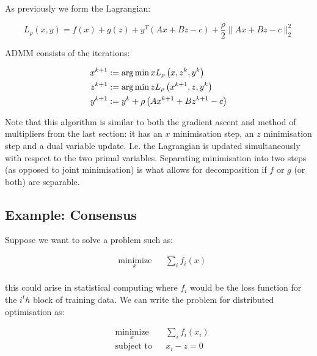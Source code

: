 \documentclass{article}
\begin{document}
As previously we form the Lagrangian:

\begin{equation}
L_\rho\left(x,y\right) = f\left( x \right) + g\left(z\right) + y^T\left(Ax+Bz-c\right) + \frac{\rho}{2}\|Ax+Bz-c\|_2^2
\end{equation}

ADMM consists of the iterations:

\begin{align}
x^{k+1} &:= \operatorname*{arg\,min}{x} L_\rho\left(x,z^k,y^k\right)\\
z^{k+1} &:= \operatorname*{arg\,min}{z} L_\rho\left(x^{k+1},z,y^k\right)\\
y^{k+1} &:= y^{k} + \rho \left(Ax^{k+1} + Bz^{k+1} - c\right)
\label{admm_algo}
\end{align}

Note that this algorithm is similar to both the gradient ascent and method of multipliers from the last section: it has an \(x\) minimisation step, an \(z\) minimisation step and a dual variable update. I.e. the Lagrangian is updated simultaneously with respect to the two primal variables. Separating minimisation into two steps (as opposed to joint minimisation) is what allows for decomposition if \(f\) or \(g\) (or both) are separable. 

\subsection{Example: Consensus}
Suppose we want to solve a problem such as:

\begin{equation*}
\begin{aligned}
& \underset{x}{\text{minimize}}
& & \sum_i f_i\left( x \right) \\
\label{consensus}
\end{aligned}
\end{equation*}

this could arise in statistical computing where \(f_i\) would be the loss function for the \(i^th\) block of training data. We can write the problem for distributed optimisation as:

\begin{equation*}
\begin{aligned}
& \underset{x}{\text{minimize}}
& & \sum_i f_i\left( x_i \right) \\
& \text{subject to}
& & x_i - z = 0
\label{admm_consensus}
\end{aligned}
\end{equation*}
\end{document}
